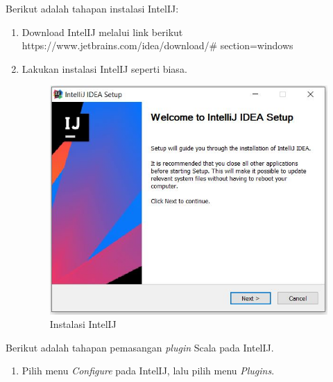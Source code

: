 \documentclass[a4paper,twoside]{article}
\begin{document}
\begin{enumerate}
Berikut adalah tahapan instalasi IntelIJ:

\begin{enumerate}
\item Download IntelIJ melalui link berikut \\
\textsf{https://www.jetbrains.com/idea/download/\# section=windows}

\item Lakukan instalasi IntelIJ seperti biasa.
\begin{figure}[H]
	\centering
	\includegraphics[scale=0.7]{intelij_install}
	\caption{Instalasi IntelIJ}
	\label{fig:intelij_install}
\end{figure}

\end{enumerate}

\noindent Berikut adalah tahapan pemasangan \textit{plugin} Scala pada IntelIJ.

\begin{enumerate}

\item Pilih menu \textit{Configure} pada IntelIJ, lalu pilih menu \textit{Plugins}.


\end{enumerate}
\end{enumerate}
\end{document}
